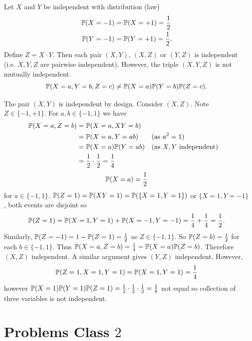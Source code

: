 \documentclass[10pt, a4paper]{article}
\begin{document}
\begin{problem}
    Let $X$ and $Y$ be independent with distribution
    (law)
    \begin{align*}
        \P(X = -1) &= \P(X = +1) = \frac{1}{2} \\
        \P(Y = -1) &= \P(Y = +1) = \frac{1}{2}.
    \end{align*}
    Define $Z = X\cdot Y$.
    Then each pair $(X, Y)$,
    $(X, Z)$ or $(Y, Z)$ is independent
    (i.e. $X, Y, Z$ are pairwise independent).
    However,
    the triple $(X, Y, Z)$ is not mutually independent.
    \[
    \P(X = a, Y = b, Z = c) \neq \P(X = a)\P(Y = b)\P(Z = c).
    \]

    \begin{solution}
        The pair $(X, Y)$ is independent by design.
        Consider $(X, Z)$.
        Note $Z \in \{-1, +1\}$.
        For $a, b \in \{-1, 1\}$ we have
        \begin{align*}
            \P(X = a, Z = b) &= \P(X = a, XY = b) \\
            &= \P(X = a, Y = ab) && \text{(as $a ^ 2 = 1$)} \\
            &= \P(X = a)\P(Y = ab) && \text{(as $X, Y$ independent)} \\
            &= \frac{1}{2}\cdot \frac{1}{2} = \frac{1}{4}
        \end{align*}
        \[
        \P(X = a) = \frac{1}{2}
        \]
        for $a \in \{-1, 1\}$.
        $\P(Z = 1) = \P(XY = 1) = \P(\{X = 1, Y = 1\})$ or $\{X = 1, Y = -1\}$,
        both events are disjoint so
        \[
        \P(Z = 1) = \P(X = 1, Y = 1) + \P(X = -1, Y = -1) = \frac{1}{4} + \frac{1}{4} = \frac{1}{2}.
        \]
        Similarly,
        $\P(Z = -1) = 1 - \P(Z = 1) = \frac{1}{2}$ as $Z \in \{-1, 1\}$.
        So $\P(Z = b) = \frac{1}{2}$ for each $b \in \{-1, 1\}$.
        Thus $\P(X = a, Z = b) = \frac{1}{4} = \P(X = a)\P(Z = b)$.
        Therefore $(X, Z)$ independent.
        A similar argument gives $(Y, Z)$ independent.
        However,
        \[
        \P(Z = 1, X = 1, Y = 1) = \P(X = 1, Y = 1) = \frac{1}{4}
        \]
        however $\P(X = 1)\P(Y = 1)\P(Z = 1) = \frac{1}{2}\cdot\frac{1}{2}\cdot\frac{1}{2} = \frac{1}{8}$ not equal so collection of three variables is not independent.
    \end{solution}
\end{problem}

\newpage

\section{Problems Class \texorpdfstring{$2$}{}}
\end{document}
